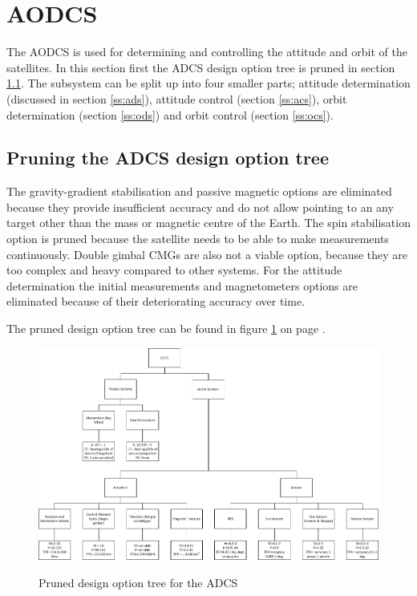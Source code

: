 \section{\acl{AODCS}}
The \ac{AODCS} is used for determining and controlling the attitude and orbit of the satellites. In this section first the \ac{ADCS} design option tree is pruned in section \ref{pruneADCS}. The subsystem can be split up into four smaller parts; attitude determination (discussed in section \ref{ss:ads}), attitude control (section \ref{ss:acs}), orbit determination (section \ref{ss:ods}) and orbit control (section \ref{ss:ocs}). 

\subsection{Pruning the \acl{ADCS} design option tree}
\label{pruneADCS}
The gravity-gradient stabilisation and passive magnetic options are eliminated because they provide insufficient accuracy and do not allow pointing to an any target other than the mass or magnetic centre of the Earth. The spin stabilisation option is pruned because the satellite needs to be able to make measurements continuously. Double gimbal \acp{CMG} are also not a viable option, because they are too complex and heavy compared to other systems.
For the attitude determination the initial measurements and magnetometers options are eliminated because of their deteriorating accuracy over time.

The pruned design option tree can be found in figure \ref{fig:pruneADCS} on page \pageref{fig:pruneADCS}.

\begin{figure}
\centering
\includegraphics[width=1.0\textwidth, angle=90]{chapters/img/prunedADCStree.png}
\label{fig:pruneADCS}
\caption{Pruned design option tree for the \acs{ADCS}}
\end{figure}

